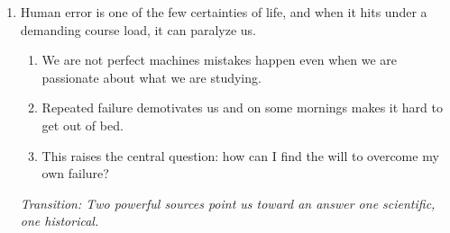 \documentclass[12pt]{article}
\begin{document}
\begin{enumerate}[label=\Alph*., leftmargin=1.5cm, itemsep=0pt]

  \item Human error is one of the few certainties of life, and when it hits under a demanding course load, it can paralyze us.
    \begin{enumerate}[label=\arabic*., leftmargin=1cm, itemsep=0pt]
      \item We are not perfect machines mistakes happen even when we are passionate about what we are studying.
      \item Repeated failure demotivates us and on some mornings makes it hard to get out of bed.
      \item This raises the central question: how can I find the will to overcome my own failure?
    \end{enumerate}

  \noindent\textit{Transition: Two powerful sources point us toward an answer one scientific, one historical.}


\end{enumerate}
\end{document}
